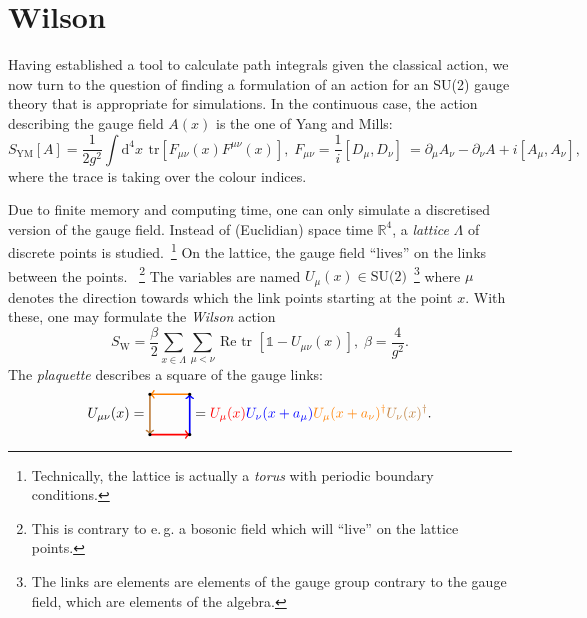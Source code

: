 \documentclass{scrartcl}
\begin{document}
\section{Wilson} \label{sec:wilson}
Having established a tool to calculate path integrals given the classical action,
we now turn to the question of finding a formulation of an action for an SU(2)
gauge theory that is appropriate for simulations. In the continuous case, the action
describing the gauge field $A(x)$ is the one of Yang and Mills:~\cite{gattringerLang}
\[
    S_\text{YM} [A] = \frac{1}{2g^2} \int \text{d}^4 x \, \
        \text{tr} [F_{\mu \nu}(x) F^{\mu \nu}(x)],
    \; F_{\mu \nu} = \frac{1}{i} [D_\mu, D_\nu] \
    = \partial_\mu A_\nu - \partial_\nu A + i [A_\mu, A_\nu],
\]
where the trace is taking over the colour indices.

Due to finite memory and computing time, one can only simulate a discretised
version of the gauge field. Instead of (Euclidian) space time $\mathbb{R}^4$, a
\emph{lattice} $\Lambda$ of discrete points is studied.~\footnote{Technically,
the lattice is actually a \emph{torus} with periodic boundary conditions.}
On the lattice, the gauge field \enquote{lives} on the links between the points.
~\footnote{This is contrary to e.\,g. a bosonic field which will \enquote{live}
on the lattice points.}
The variables are named $U_\mu(x) \in \text{SU(2)}$~\footnote{The links are elements
are elements of the gauge group contrary to the gauge field, which are elements
of the algebra.} where $\mu$ denotes the direction
towards which the link points starting at the point $x$. With these, one may formulate
the \emph{Wilson} action~\cite{urbachCPscript}
\begin{equation} \label{eq:wilson}
    S_\text{W} = \frac{\beta}{2} \sum_{x \in \Lambda} \sum_{\mu < \nu} \
    \text{Re tr } [\mathds{1} - U_{\mu \nu}(x)], \; \beta = \frac{4}{g^2}.
\end{equation}
The \emph{plaquette} describes a square of the gauge links:
\[
U_{\mu \nu}(x) =
\begin{tikzpicture}[baseline=-0.5ex]
\draw[->, red, very thick] (0,-.5) -> (1,-.5);
\draw[->, blue, very thick] (1,-.5) -> (1,.5);
\draw[->, orange, very thick] (1,.5) -> (0,.5);
\draw[->, brown, very thick] (0,.5) -> (0,-.5);
\foreach \x in {0,...,1}
{
	\foreach \y in {-.5,...,.5}
	{
		\fill[color=black] (\x,\y) circle (.04);
	}
}
\end{tikzpicture}
= \textcolor{red}{U_\mu(x)}
\textcolor{blue}{U_\nu(x + a_\mu)}
\textcolor{orange}{U_\mu(x + a_\nu)^\dag}
\textcolor{brown}{U_\nu(x)^\dag}.
\]		
\end{document}
